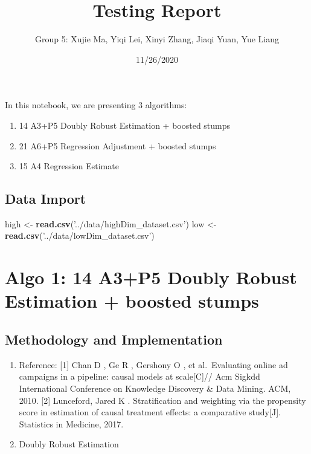 \documentclass[]{article}
\title{Testing Report}
\author{Group 5: Xujie Ma, Yiqi Lei, Xinyi Zhang, Jiaqi Yuan, Yue Liang}
\date{11/26/2020}
\newenvironment{Shaded}{\begin{snugshade}}{\end{snugshade}}
\newcommand{\KeywordTok}[1]{\textcolor[rgb]{0.13,0.29,0.53}{\textbf{#1}}}
\newcommand{\NormalTok}[1]{#1}
\newcommand{\StringTok}[1]{\textcolor[rgb]{0.31,0.60,0.02}{#1}}
\providecommand{\tightlist}{%
  \setlength{\itemsep}{0pt}\setlength{\parskip}{0pt}}
\begin{document}
\maketitle

In this notebook, we are presenting 3 algorithms:

\begin{enumerate}
\def\labelenumi{\arabic{enumi}.}
\item
  14 A3+P5 Doubly Robust Estimation + boosted stumps
\item
  21 A6+P5 Regression Adjustment + boosted stumps
\item
  15 A4 Regression Estimate
\end{enumerate}

\hypertarget{data-import}{%
\subsection{Data Import}\label{data-import}}

\begin{Shaded}
\begin{Highlighting}[]
\NormalTok{high <-}\StringTok{ }\KeywordTok{read.csv}\NormalTok{(}\StringTok{'../data/highDim_dataset.csv'}\NormalTok{)}
\NormalTok{low <-}\StringTok{ }\KeywordTok{read.csv}\NormalTok{(}\StringTok{'../data/lowDim_dataset.csv'}\NormalTok{)}
\end{Highlighting}
\end{Shaded}

\hypertarget{algo-1-14-a3p5-doubly-robust-estimation-boosted-stumps}{%
\section{Algo 1: 14 A3+P5 Doubly Robust Estimation + boosted
stumps}\label{algo-1-14-a3p5-doubly-robust-estimation-boosted-stumps}}

\hypertarget{methodology-and-implementation}{%
\subsection{Methodology and
Implementation}\label{methodology-and-implementation}}

\begin{enumerate}
\def\labelenumi{\arabic{enumi}.}
\tightlist
\item
  Reference: {[}1{]} Chan D , Ge R , Gershony O , et al.~Evaluating
  online ad campaigns in a pipeline: causal models at scale{[}C{]}// Acm
  Sigkdd International Conference on Knowledge Discovery \& Data Mining.
  ACM, 2010. {[}2{]} Lunceford, Jared K . Stratification and weighting
  via the propensity score in estimation of causal treatment effects: a
  comparative study{[}J{]}. Statistics in Medicine, 2017.
\item
  Doubly Robust Estimation
\end{enumerate}
\end{document}
